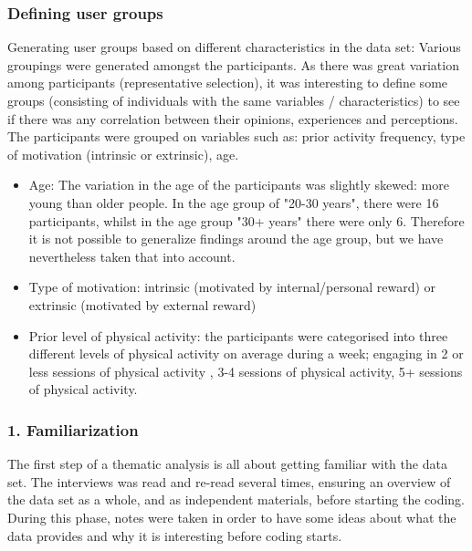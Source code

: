     \subsubsection{Defining user groups}
    Generating user groups based on different characteristics in the data set: Various groupings were generated amongst the participants. As there was great variation among participants (representative selection), it was interesting to define some groups (consisting of individuals with the same variables / characteristics) to see if there was any correlation between their opinions, experiences and perceptions. The participants were grouped on variables such as: prior activity frequency, type of motivation (intrinsic or extrinsic), age.
    
\begin{itemize}
\item Age: The variation in the age of the participants was slightly skewed: more young than older people. In the age group of "20-30 years", there were 16 participants, whilst in the age group "30+ years" there were only 6. Therefore it is not possible to generalize findings around the age group, but we have nevertheless taken that into account.
\item     Type of motivation: intrinsic (motivated by internal/personal reward) or extrinsic (motivated by external reward)
\item     Prior level of physical activity: the participants were categorised into three different levels of physical activity on average during a week; engaging in 2 or less sessions of physical activity , 3-4 sessions of physical activity, 5+ sessions of physical activity. 
\end{itemize}
    
    \subsubsection{1. Familiarization}
    The first step of a thematic analysis is all about getting familiar with the data set. The interviews was read and re-read several times, ensuring an overview of the data set as a whole, and as independent materials, before starting the coding. During this phase, notes were taken in order to have some ideas about what the data provides and why it is interesting before coding starts.
